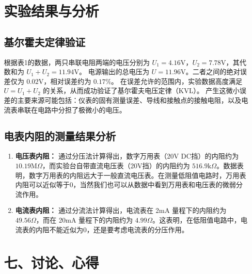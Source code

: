 ﻿\documentclass[10.5pt]{config}
\begin{document}
\section{实验结果与分析}
\subsection{基尔霍夫定律验证}
根据表1的数据，两只串联电阻两端的电压分别为 $U_1 = 4.16\mathrm{V}$，$U_2 = 7.78\mathrm{V}$，其代数和为 $U_1 + U_2 = 11.94\mathrm{V}$。
电源输出的总电压为 $U = 11.96\mathrm{V}$。二者之间的绝对误差仅为 $0.02\mathrm{V}$，相对误差约为 $0.17\%$。
在误差允许的范围内，实验数据高度满足 $U = U_1 + U_2$ 的关系，从而成功验证了基尔霍夫电压定律（KVL）。
产生这微小误差的主要来源可能包括：仪表的固有测量误差、导线和接触点的接触电阻，以及电流表串联在电路中分担了极微小的电压。

\subsection{电表内阻的测量结果分析}
\begin{enumerate}
    \item \textbf{电压表内阻：} 通过分压法计算得出，数字万用表（20V DC挡）的内阻约为 $10.19\mathrm{M}\Omega$，而实验台自带直流电压表（20V挡）的内阻约为 $516.9\mathrm{k}\Omega$。数据表明，数字万用表的内阻远大于一般直流电压表。在测量低阻值电路时，万用表内阻可以近似等于0，当然我们也可以从数据中看到万用表和电压表的微弱分流作用。
    \item \textbf{电流表内阻：} 通过分流法计算得出，电流表在 2mA 量程下的内阻约为 $49.56\Omega$，而在 20mA 量程下的内阻约为 $4.99\Omega$。这表明，在低阻值电路中，电流表的内阻不能近似为0，还是要考虑电流表的分压作用。
\end{enumerate}

\section*{七、讨论、心得}
\end{document}
